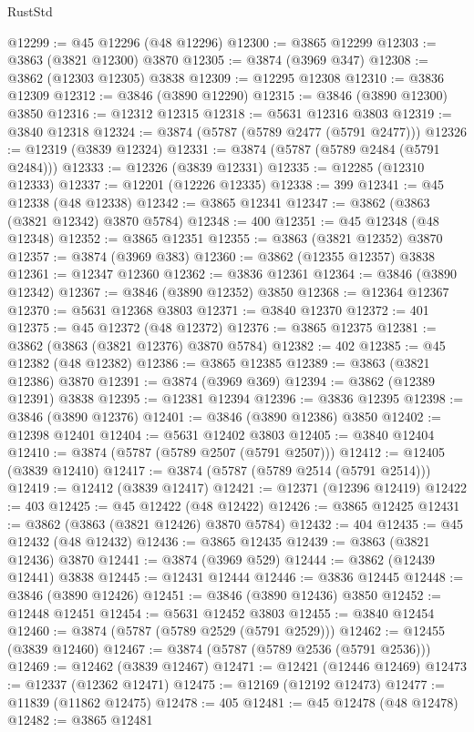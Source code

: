 \begin{lexlean}{RustStd}
\begin{coremodule}
@12299 := @45 @12296 (@48 @12296)
@12300 := @3865 @12299
@12303 := @3863 (@3821 @12300) @3870
@12305 := @3874 (@3969 @347)
@12308 := @3862 (@12303 @12305) @3838
@12309 := @12295 @12308
@12310 := @3836 @12309
@12312 := @3846 (@3890 @12290)
@12315 := @3846 (@3890 @12300) @3850
@12316 := @12312 @12315
@12318 := @5631 @12316 @3803
@12319 := @3840 @12318
@12324 := @3874 (@5787 (@5789 @2477 (@5791 @2477)))
@12326 := @12319 (@3839 @12324)
@12331 := @3874 (@5787 (@5789 @2484 (@5791 @2484)))
@12333 := @12326 (@3839 @12331)
@12335 := @12285 (@12310 @12333)
@12337 := @12201 (@12226 @12335)
@12338 := 399
@12341 := @45 @12338 (@48 @12338)
@12342 := @3865 @12341
@12347 := @3862 (@3863 (@3821 @12342) @3870 @5784)
@12348 := 400
@12351 := @45 @12348 (@48 @12348)
@12352 := @3865 @12351
@12355 := @3863 (@3821 @12352) @3870
@12357 := @3874 (@3969 @383)
@12360 := @3862 (@12355 @12357) @3838
@12361 := @12347 @12360
@12362 := @3836 @12361
@12364 := @3846 (@3890 @12342)
@12367 := @3846 (@3890 @12352) @3850
@12368 := @12364 @12367
@12370 := @5631 @12368 @3803
@12371 := @3840 @12370
@12372 := 401
@12375 := @45 @12372 (@48 @12372)
@12376 := @3865 @12375
@12381 := @3862 (@3863 (@3821 @12376) @3870 @5784)
@12382 := 402
@12385 := @45 @12382 (@48 @12382)
@12386 := @3865 @12385
@12389 := @3863 (@3821 @12386) @3870
@12391 := @3874 (@3969 @369)
@12394 := @3862 (@12389 @12391) @3838
@12395 := @12381 @12394
@12396 := @3836 @12395
@12398 := @3846 (@3890 @12376)
@12401 := @3846 (@3890 @12386) @3850
@12402 := @12398 @12401
@12404 := @5631 @12402 @3803
@12405 := @3840 @12404
@12410 := @3874 (@5787 (@5789 @2507 (@5791 @2507)))
@12412 := @12405 (@3839 @12410)
@12417 := @3874 (@5787 (@5789 @2514 (@5791 @2514)))
@12419 := @12412 (@3839 @12417)
@12421 := @12371 (@12396 @12419)
@12422 := 403
@12425 := @45 @12422 (@48 @12422)
@12426 := @3865 @12425
@12431 := @3862 (@3863 (@3821 @12426) @3870 @5784)
@12432 := 404
@12435 := @45 @12432 (@48 @12432)
@12436 := @3865 @12435
@12439 := @3863 (@3821 @12436) @3870
@12441 := @3874 (@3969 @529)
@12444 := @3862 (@12439 @12441) @3838
@12445 := @12431 @12444
@12446 := @3836 @12445
@12448 := @3846 (@3890 @12426)
@12451 := @3846 (@3890 @12436) @3850
@12452 := @12448 @12451
@12454 := @5631 @12452 @3803
@12455 := @3840 @12454
@12460 := @3874 (@5787 (@5789 @2529 (@5791 @2529)))
@12462 := @12455 (@3839 @12460)
@12467 := @3874 (@5787 (@5789 @2536 (@5791 @2536)))
@12469 := @12462 (@3839 @12467)
@12471 := @12421 (@12446 @12469)
@12473 := @12337 (@12362 @12471)
@12475 := @12169 (@12192 @12473)
@12477 := @11839 (@11862 @12475)
@12478 := 405
@12481 := @45 @12478 (@48 @12478)
@12482 := @3865 @12481

\end{coremodule}
\end{lexlean}
